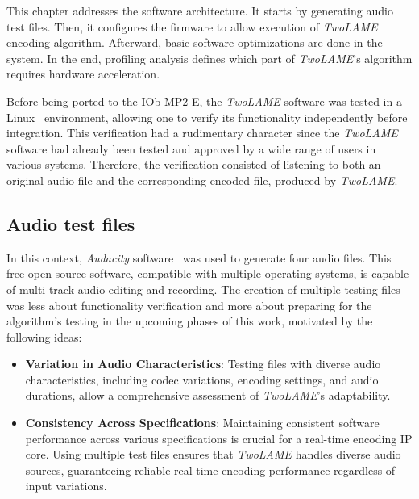 This chapter addresses the software architecture.
It starts by generating audio test files. Then, it configures the firmware to allow execution of \textit{TwoLAME} encoding algorithm. Afterward, basic software optimizations are done in the system. In the end, profiling analysis defines which part of \textit{TwoLAME}'s algorithm requires hardware acceleration.

Before being ported to the IOb-MP2-E, the \textit{TwoLAME} software was tested in a Linux~\cite{bib:gnulinux} environment, allowing one to verify its functionality independently before integration. This verification had a rudimentary character since the \textit{TwoLAME} software had already been tested and approved by a wide range of users in various systems. Therefore, the verification consisted of listening to both an original audio file and the corresponding encoded file, produced by \textit{TwoLAME}.

\subsection{Audio test files}

In this context, \textit{Audacity} software~\cite{bib:audacity} was used to generate four audio files. This free open-source software, compatible with multiple operating systems, is capable of multi-track audio editing and recording. 
The creation of multiple testing files was less about functionality verification and more about preparing for the algorithm's testing in the upcoming phases of this work, motivated by the following ideas:

\begin{itemize}

    \item \textbf{Variation in Audio Characteristics}: Testing files with diverse audio characteristics, including codec variations, encoding settings, and audio durations, allow a comprehensive assessment of \textit{TwoLAME}'s adaptability.
    \item \textbf{Consistency Across Specifications}: Maintaining consistent software performance across various specifications is crucial for a real-time encoding IP core. Using multiple test files ensures that \textit{TwoLAME} handles diverse audio sources, guaranteeing reliable real-time encoding performance regardless of input variations.
\end{itemize}

